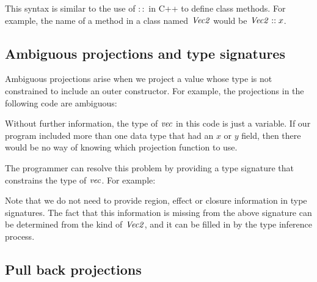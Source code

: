 
This syntax is similar to the use of $::$ in C++ to define class methods. For example, the name of a method in a class named $\operatorname{\mathit{Vec2}}$ would be $\operatorname{\mathit{Vec2}}::x$. 

\clearpage{}
\subsection{Ambiguous projections and type signatures}
\label{System:Projections:ambiguous}

Ambiguous projections arise when we project a value whose type is not constrained to include an outer constructor. For example, the projections in the following code are ambiguous:


Without further information, the type of $\operatorname{\mathit{vec}}$ in this code is just a variable. If our program included more than one data type that had an $x$ or $y$ field, then there would be no way of knowing which projection function to use. 

The programmer can resolve this problem by providing a type signature that constrains the type of $\operatorname{\mathit{vec}}$. For example:


Note that we do not need to provide region, effect or closure information in type signatures. The fact that this information is missing from the above signature can be determined from the kind of $\operatorname{\mathit{Vec2}}$, and it can be filled in by the type inference process. 

\subsection{Pull back projections}
\label{System:Projections:pull-back}

